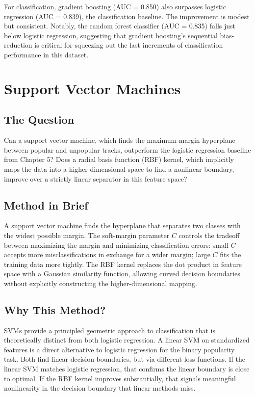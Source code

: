 \documentclass[12pt, oneside]{book}
\begin{document}
For classification, gradient boosting (AUC = 0.850) also surpasses logistic regression (AUC = 0.839), the classification baseline. The improvement is modest but consistent. Notably, the random forest classifier (AUC = 0.835) falls just below logistic regression, suggesting that gradient boosting's sequential bias-reduction is critical for squeezing out the last increments of classification performance in this dataset.
 
\chapter{Support Vector Machines}

\section{The Question}
 
Can a support vector machine, which finds the maximum-margin hyperplane between popular and unpopular tracks, outperform the logistic regression baseline from Chapter 5? Does a radial basis function (RBF) kernel, which implicitly maps the data into a higher-dimensional space to find a nonlinear boundary, improve over a strictly linear separator in this feature space?
 
\section{Method in Brief}
 
A support vector machine finds the hyperplane that separates two classes with the widest possible margin. The soft-margin parameter $C$ controls the tradeoff between maximizing the margin and minimizing classification errors: small $C$ accepts more misclassifications in exchange for a wider margin; large $C$ fits the training data more tightly. The RBF kernel replaces the dot product in feature space with a Gaussian similarity function, allowing curved decision boundaries without explicitly constructing the higher-dimensional mapping.
 
\section{Why This Method?}
 
SVMs provide a principled geometric approach to classification that is theoretically distinct from both logistic regression. A linear SVM on standardized features is a direct alternative to logistic regression for the binary popularity task. Both find linear decision boundaries, but via different loss functions. If the linear SVM matches logistic regression, that confirms the linear boundary is close to optimal. If the RBF kernel improves substantially, that signals meaningful nonlinearity in the decision boundary that linear methods miss.
 
\end{document}
